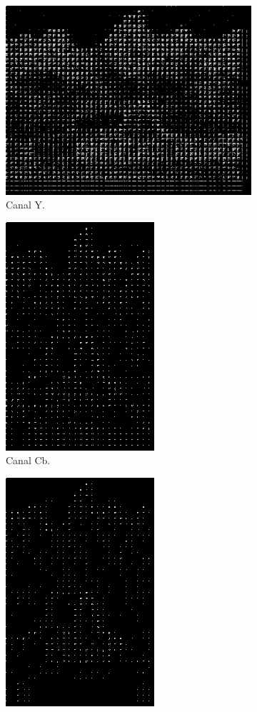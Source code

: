 \documentclass[a4paper, 12pt]{article}
\begin{document}
        \begin{figure}[H]
            \begin{subfigure}{0.3\textwidth}
                \centering
                \includegraphics[scale=0.5] {resources/DPCM/Y_DPCM25.png}
                \caption{ Canal Y.}
            \end{subfigure}
            \hfill
            \begin{subfigure}{0.3\textwidth}
                \centering 
                \includegraphics[scale=0.5]{resources/DPCM/CB_DPCM25.png}
                \caption{ Canal Cb.}
            \end{subfigure}
            \hfill
            \begin{subfigure}{0.3\textwidth}
                \centering
                \includegraphics[scale=0.5]{resources/DPCM/CR_DPCM25.png} 

\end{subfigure}
\end{figure}
\end{document}
